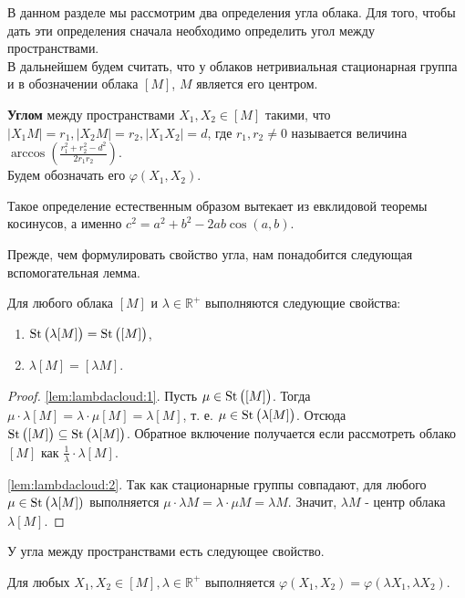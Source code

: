 В данном разделе мы рассмотрим два определения угла облака. Для того, чтобы
дать эти определения сначала необходимо определить угол между пространствами.
\\
В дальнейшем будем считать, что у облаков нетривиальная стационарная группа и в
обозначении облака $ [M] $, $ M $ является его центром.
\begin{defin}
  \textbf{Углом} между пространствами $ X_1, X_2 \in [M] $ такими, что $ |X_1
  M| = r_1, | X_2 M | =r_2, |X_1 X_2| = d$, где $ r_1,
  r_2 \neq 0 $ называется величина $ \arccos \left(\frac{r_1^2 +
  r_{2}^2 - d^2}{2r_1r_2} \right)$.\\ Будем обозначать его $
  \varphi(X_1, X_2) $.
\end{defin}
\begin{remark}
  Такое определение естественным образом вытекает из евклидовой теоремы
  косинусов, а именно $ c^{2} = a^2 + b^2 - 2ab\cos (a,b) $.
\end{remark}
Прежде, чем формулировать свойство угла, нам понадобится следующая
вспомогательная лемма.
\begin{lemma}
  \label{lem:lambdacloud} Для любого облака \( [M] \) и \( \lambda
  \in\mathbb{R}^+ \) выполняются следующие свойства{\textup{:}}
  \begin{enumerate}
    \item \( \operatorname{St}\big(\lambda [M]\big) = \operatorname{St}\big([M]\big)\),
      \label{lem:lambdacloud:1}
    \item \( \lambda [M] = [\lambda M] \).\label{lem:lambdacloud:2}
  \end{enumerate}
\end{lemma}
\begin{proof}
  \ref{lem:lambdacloud:1}. Пусть \( \mu \in \operatorname{St}\big([M]\big) \). Тогда \( \mu
  \cdot \lambda [M] = \lambda \cdot \mu [M]= \lambda [M] \), т. е. \( \mu \in
  \operatorname{St}\big(\lambda [M]\big) \). Отсюда \( \operatorname{St}\big([M]\big) \subseteq
  \operatorname{St}\big(\lambda [M]\big) \). Обратное включение получается если рассмотреть
  облако \( [M] \) как \(\frac{1}{\lambda}\cdot \lambda [M] \).

  \ref{lem:lambdacloud:2}. Так как стационарные группы совпадают, для любого
  \( \mu \in  \operatorname{St}\big(\lambda [M])\) выполняется \( \mu \cdot \lambda M =
  \lambda \cdot \mu M = \lambda M \). Значит, \( \lambda M \) - центр
  облака \( \lambda [M] \).
\end{proof}
У угла между пространствами есть следующее свойство.
\begin{lemma}
  \label{lemmaAngleBetweenSpaces} Для любых \( X_1, X_2 \in [M], \lambda
  \in\mathbb{R}^+ \) выполняется \( \varphi (X_1, X_2) = \varphi (\lambda
      X_1,
  \lambda X_2) \).
\end{lemma}
